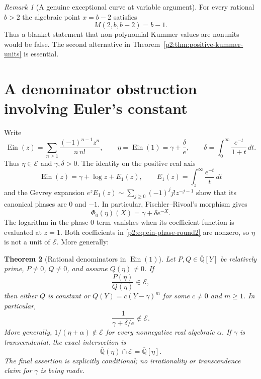 \documentclass[11pt,a4paper]{article}
\newtheorem{theorem}{Theorem}[section]
\theoremstyle{definition}
\theoremstyle{remark}
\newtheorem{remark}[theorem]{Remark}
\numberwithin{equation}{section}
\begin{document}
\begin{remark}[A genuine exceptional curve at variable argument]
For every rational $b>2$ the algebraic point $x=b-2$ satisfies
\[
 M(2,b,b-2)=b-1.
\]
Thus a blanket statement that non-polynomial Kummer values are nonunits
would be false.  The second alternative in
Theorem~\ref{p2:thm:positive-kummer-units} is essential.
\end{remark}

\section{A denominator obstruction involving Euler's constant}
\label{p2:sec:ein-denominator-round2}

Write
\[
 \operatorname{Ein}(z)=\sum_{n\ge1}\frac{(-1)^{n-1}z^n}{n\,n!},
 \qquad \eta=\operatorname{Ein}(1)=\gamma+\frac\delta e,
 \qquad \delta=\int_0^\infty\frac{e^{-t}}{1+t}\,dt.
\]
Thus $\eta\in\mathcal E$ and $\gamma,\delta>0$.
The identity on the positive real axis
\[
 \operatorname{Ein}(z)=\gamma+\log z+E_1(z),
 \qquad
 E_1(z)=\int_z^\infty\frac{e^{-t}}{t}\,dt
\]
and the Gevrey expansion
$e^zE_1(z)\sim\sum_{j\ge0}(-1)^j j!z^{-j-1}$
show that its canonical phases are $0$ and $-1$.
In particular, Fischler--Rivoal's morphism gives
\begin{equation}
\label{p2:eq:ein-phase-round2}
 \Phi_0(\eta)(X)=\gamma+\delta e^{-X}.
\end{equation}
The logarithm in the phase-$0$ term vanishes when its coefficient
function is evaluated at $z=1$.  Both coefficients in
\eqref{p2:eq:ein-phase-round2} are nonzero, so $\eta$ is not a unit of
$\mathcal E$.  More generally:

\begin{theorem}[Rational denominators in $\operatorname{Ein}(1)$]
\label{p2:thm:ein-denominators}
Let $P,Q\in\overline{\mathbb Q}[Y]$ be relatively prime,
$P\ne0$, $Q\ne0$, and assume $Q(\eta)\ne0$.  If
\[
 \frac{P(\eta)}{Q(\eta)}\in\mathcal E,
\]
then either $Q$ is constant or
$Q(Y)=c(Y-\gamma)^m$ for some $c\ne0$ and $m\ge1$.
In particular,
\[
 \frac1{\gamma+\delta/e}\notin\mathcal E.
\]
More generally, $1/(\eta+\alpha)\notin\mathcal E$ for every
nonnegative real algebraic $\alpha$.
If $\gamma$ is transcendental, the exact intersection is
\[
 \overline{\mathbb Q}(\eta)\cap\mathcal E
       =\overline{\mathbb Q}[\eta].
\]
The final assertion is explicitly conditional; no irrationality or
transcendence claim for $\gamma$ is being made.
\end{theorem}
\end{document}
